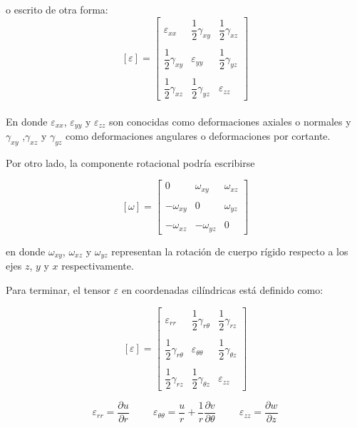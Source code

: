 \documentclass[../notas medios.tex]{subfiles}
\begin{document}
o escrito de otra forma: 
\[	
[\varepsilon] =
\begin{bmatrix}
	\varepsilon_{xx} & \dfrac{1}{2} \gamma_{xy} & \dfrac{1}{2} \gamma_{xz}  \\\\
	\dfrac{1}{2} \gamma_{xy}  & \varepsilon_{yy} & \dfrac{1}{2}  \gamma_{yz}  \\\\
	 \dfrac{1}{2} \gamma_{xz} & \dfrac{1}{2} \gamma_{yz}  &  \varepsilon_{zz}
\end{bmatrix}\]\\

En donde $\varepsilon_{xx}$, $\varepsilon_{yy}$ y $\varepsilon_{zz}$ son conocidas como deformaciones axiales o normales y  $\gamma_{xy}$ ,$ \gamma_{xz}$  y $\gamma_{yz}$  como deformaciones angulares o deformaciones por cortante. 

Por otro lado, la componente rotacional podría escribirse 

\[	
[\omega] =
\begin{bmatrix}
	0 & \omega_{xy}  &  \omega_{xz} \\\\
	 -\omega_{xy}  & 0 &  \omega_{yz} \\\\ 
	 -\omega_{xz}  & -\omega_{yz}  &  0
\end{bmatrix}\] 

en donde $\omega_{xy}$, $\omega_{xz}$ y  $\omega_{yz}$ representan la rotación de cuerpo rígido respecto a los ejes $z$, $y$ y $x$ respectivamente. 


Para terminar, el tensor $\varepsilon$ en coordenadas cilíndricas está definido como:  

\[	
[\varepsilon] =
\begin{bmatrix}
	\varepsilon_{rr} & \dfrac{1}{2} \gamma_{r\theta} & \dfrac{1}{2} \gamma_{rz}  \\\\
	\dfrac{1}{2} \gamma_{r\theta}  & \varepsilon_{{\theta}{\theta}} & \dfrac{1}{2}  \gamma_{{\theta}z}  \\\\
	 \dfrac{1}{2} \gamma_{rz} & \dfrac{1}{2} \gamma_{{\theta}z}  &  \varepsilon_{zz}
\end{bmatrix}\]


\begin{equation*}	
	\varepsilon_{rr} = \dfrac{\partial u}{\partial r}
	\hspace{1cm}
	\varepsilon_{\theta \theta} = \dfrac{u}{r} + \dfrac{1}{r} \dfrac{\partial v}{\partial \theta}
	\hspace{1cm}
	\varepsilon_{zz} = \dfrac{\partial w}{\partial z} 
\end{equation*}
\end{document}
